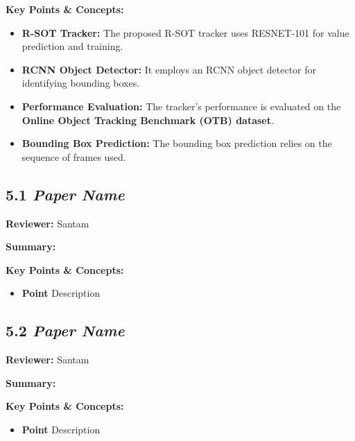 \documentclass{article}
\begin{document}
\vspace{0.3cm}

\textbf{Key Points \& Concepts:}
\begin{itemize}
  \item \textbf{R-SOT Tracker:} The proposed R-SOT tracker uses RESNET-101 for value prediction and training.
  \item \textbf{RCNN Object Detector:} It employs an RCNN object detector for identifying bounding boxes.
  \item \textbf{Performance Evaluation:} The tracker's performance is evaluated on the \textbf{Online Object Tracking Benchmark (OTB) dataset}.
  \item \textbf{Bounding Box Prediction:} The bounding box prediction relies on the sequence of frames used.
\end{itemize}

\subsection*{5.1 \textit{Paper Name}}

\hspace*{\parindent}\textbf{Reviewer:} Santam

\vspace{0.3cm}

\textbf{Summary:}

\vspace{0.3cm}

\textbf{Key Points \& Concepts:}
\begin{itemize}
  \item \textbf{Point} Description
\end{itemize}

\subsection*{5.2 \textit{Paper Name}}

\hspace*{\parindent}\textbf{Reviewer:} Santam

\vspace{0.3cm}

\textbf{Summary:}

\vspace{0.3cm}

\textbf{Key Points \& Concepts:}
\begin{itemize}
  \item \textbf{Point} Description
\end{itemize}
\end{document}
